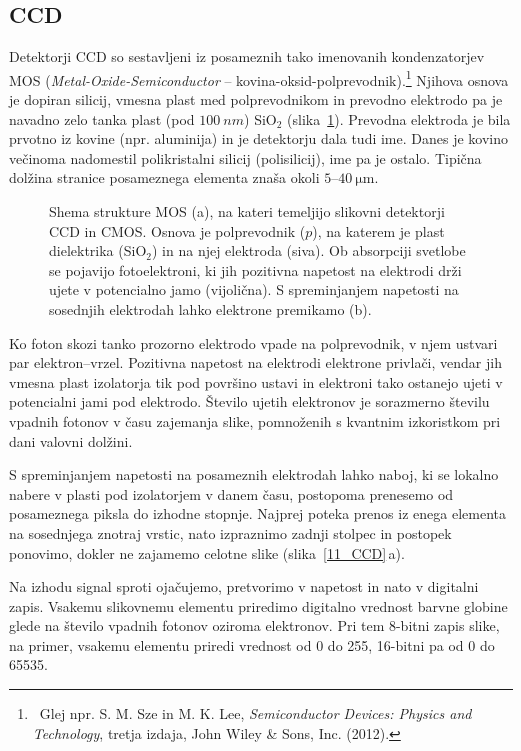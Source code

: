 \subsection*{CCD}
Detektorji CCD so sestavljeni iz posameznih tako imenovanih kondenzatorjev MOS 
({\it Metal-Oxide-Semi\-conductor}
-- kovina-oksid-polprevodnik).\footnote{~Glej npr. 
S. M. Sze in M. K. Lee, {\it Semiconductor Devices: Physics and Technology}, 
tretja izdaja, John Wiley \& Sons, Inc. (2012).}
Njihova osnova je dopiran silicij, vmesna 
plast med polprevodnikom in prevodno elektrodo pa je navadno zelo tanka plast (pod $100~\si{nm}$)
SiO$_2$ (slika~\ref{11_MOS}).
Prevodna elektroda je bila prvotno iz kovine (npr. aluminija) in je detektorju dala tudi ime.
Danes je kovino večinoma nadomestil polikristalni silicij (polisilicij), ime pa je ostalo.
Tipična dolžina stranice posameznega elementa znaša okoli $5$--$40~\si{\micro\meter}$. 
\begin{figure}[ht]
\centering
\def\svgwidth{140truemm} 

\caption{Shema strukture MOS (a), na kateri temeljijo slikovni detektorji CCD in CMOS. Osnova je 
polprevodnik ($p$), na katerem je plast dielektrika (SiO$_2$) in na njej elektroda (siva). 
Ob absorpciji svetlobe se pojavijo fotoelektroni, ki jih pozitivna napetost
na elektrodi drži ujete v potencialno jamo (vijolična). S spreminjanjem napetosti
na sosednjih elektrodah lahko elektrone premikamo (b).}
\label{11_MOS}
\end{figure}

Ko foton skozi tanko prozorno elektrodo vpade na polprevodnik, v njem ustvari
par elektron--vrzel. Pozitivna napetost na elektrodi elektrone privlači, vendar jih 
vmesna plast izolatorja tik pod površino ustavi in elektroni tako ostanejo ujeti v potencialni jami
pod elektrodo. Število ujetih elektronov je sorazmerno številu vpadnih fotonov v času zajemanja slike, 
pomnoženih s kvantnim izkoristkom pri dani valovni dolžini. 

S spreminjanjem napetosti na posameznih elektrodah lahko naboj, ki se lokalno nabere 
v plasti pod izolatorjem v danem času, postopoma prenesemo od posameznega 
piksla do izhodne stopnje. Najprej poteka prenos iz enega elementa na sosednjega znotraj vrstic, 
nato izpraznimo zadnji stolpec in postopek ponovimo, dokler ne zajamemo celotne slike 
(slika~\ref{11_CCD}\,a). 

Na izhodu signal sproti ojačujemo, 
pretvorimo v napetost in nato  v digitalni zapis. Vsakemu slikovnemu elementu priredimo
digitalno vrednost barvne globine glede na število vpadnih fotonov oziroma elektronov. Pri tem
8-bitni zapis slike, na primer, vsakemu elementu priredi vrednost od 0 do 255, 16-bitni pa od 0 do 65535.

